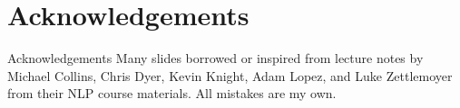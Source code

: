 
\section*{Acknowledgements}

\begin{frame}
\centering
\begin{alertblock}{Acknowledgements}
Many slides borrowed or inspired from lecture notes by Michael Collins, Chris Dyer, Kevin Knight, Adam Lopez, and Luke Zettlemoyer from their NLP course materials. All mistakes are my own.
\end{alertblock}
\end{frame}

